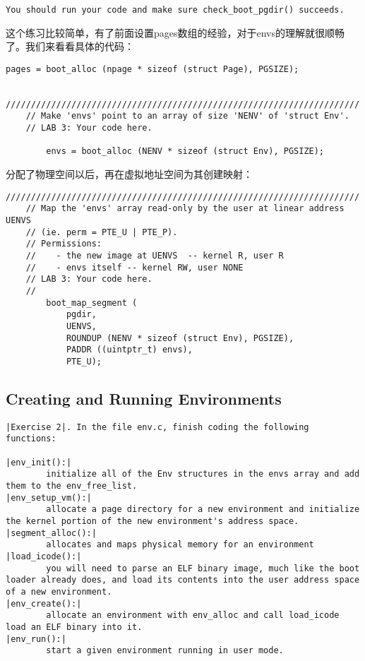 \documentclass{article}
\begin{document}
\begin{CJK*}{UTF8}{gkai}
\begin{lstlisting}[style=exercise]
You should run your code and make sure check_boot_pgdir() succeeds.
\end{lstlisting}

这个练习比较简单，有了前面设置pages数组的经验，对于envs的理解就很顺畅了。我们来看看具体的代码：

\begin{lstlisting}[style=ccode, title={\scriptsize \ttfamily \bfseries kern/pmap.c: i386\_vm\_init ()}]
	pages = boot_alloc (npage * sizeof (struct Page), PGSIZE);

	//////////////////////////////////////////////////////////////////////
	// Make 'envs' point to an array of size 'NENV' of 'struct Env'.
	// LAB 3: Your code here.
	
        envs = boot_alloc (NENV * sizeof (struct Env), PGSIZE);
\end{lstlisting}

分配了物理空间以后，再在虚拟地址空间为其创建映射：


\begin{lstlisting}[style=ccode, title={\scriptsize \ttfamily \bfseries kern/pmap.c: i386\_vm\_init ()}]
	//////////////////////////////////////////////////////////////////////
	// Map the 'envs' array read-only by the user at linear address UENVS
	// (ie. perm = PTE_U | PTE_P).
	// Permissions:
	//    - the new image at UENVS  -- kernel R, user R
	//    - envs itself -- kernel RW, user NONE
	// LAB 3: Your code here.
	//
        boot_map_segment (
            pgdir,
            UENVS,
            ROUNDUP (NENV * sizeof (struct Env), PGSIZE),
            PADDR ((uintptr_t) envs),
            PTE_U);
\end{lstlisting}


\subsection{Creating and Running Environments}

\begin{lstlisting}[style=exercise]
|Exercise 2|. In the file env.c, finish coding the following functions:

|env_init():|
        initialize all of the Env structures in the envs array and add them to the env_free_list.
|env_setup_vm():|
        allocate a page directory for a new environment and initialize the kernel portion of the new environment's address space.
|segment_alloc():|
        allocates and maps physical memory for an environment
|load_icode():|
        you will need to parse an ELF binary image, much like the boot loader already does, and load its contents into the user address space of a new environment.
|env_create():|
        allocate an environment with env_alloc and call load_icode load an ELF binary into it.
|env_run():|
        start a given environment running in user mode.


\end{lstlisting}
\end{CJK*}
\end{document}
